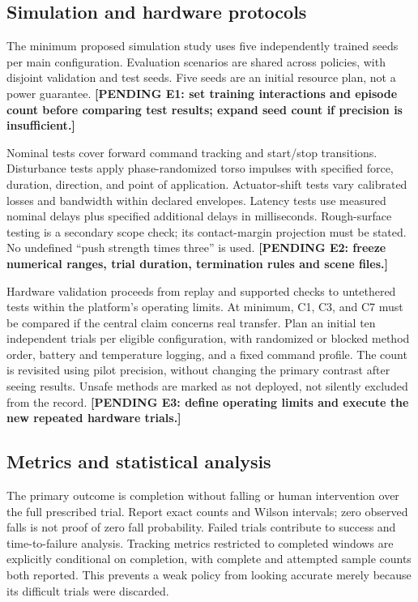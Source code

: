 \documentclass[11pt,a4paper]{article}
\newcommand{\pending}[1]{\textbf{[PENDING #1]}}
\begin{document}
\subsection{Simulation and hardware protocols}
The minimum proposed simulation study uses five independently trained seeds per main configuration. Evaluation scenarios are shared across policies, with disjoint validation and test seeds. Five seeds are an initial resource plan, not a power guarantee. \pending{E1: set training interactions and episode count before comparing test results; expand seed count if precision is insufficient.}

Nominal tests cover forward command tracking and start/stop transitions. Disturbance tests apply phase-randomized torso impulses with specified force, duration, direction, and point of application. Actuator-shift tests vary calibrated losses and bandwidth within declared envelopes. Latency tests use measured nominal delays plus specified additional delays in milliseconds. Rough-surface testing is a secondary scope check; its contact-margin projection must be stated. No undefined ``push strength times three'' is used. \pending{E2: freeze numerical ranges, trial duration, termination rules and scene files.}

Hardware validation proceeds from replay and supported checks to untethered tests within the platform's operating limits. At minimum, C1, C3, and C7 must be compared if the central claim concerns real transfer. Plan an initial ten independent trials per eligible configuration, with randomized or blocked method order, battery and temperature logging, and a fixed command profile. The count is revisited using pilot precision, without changing the primary contrast after seeing results. Unsafe methods are marked as not deployed, not silently excluded from the record. \pending{E3: define operating limits and execute the new repeated hardware trials.}

\subsection{Metrics and statistical analysis}
The primary outcome is completion without falling or human intervention over the full prescribed trial. Report exact counts and Wilson intervals; zero observed falls is not proof of zero fall probability. Failed trials contribute to success and time-to-failure analysis. Tracking metrics restricted to completed windows are explicitly conditional on completion, with complete and attempted sample counts both reported. This prevents a weak policy from looking accurate merely because its difficult trials were discarded.
\end{document}
